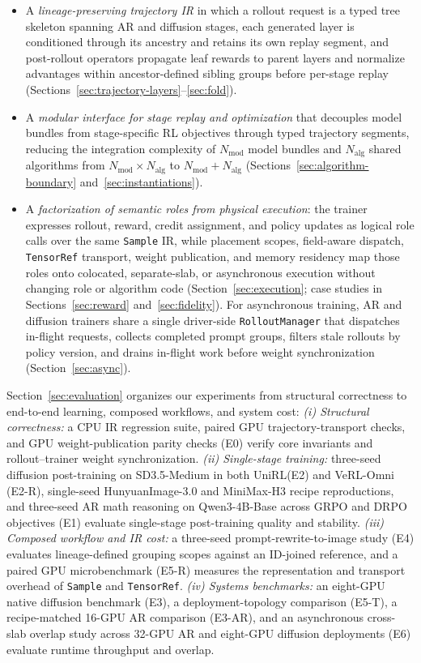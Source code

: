 \documentclass[10pt]{article}
\newcommand{\system}{UniRL\xspace}
\newcommand{\sample}{\texttt{Sample}}
\begin{document}
\begin{itemize}
  \item A \emph{lineage-preserving trajectory IR} in which a rollout request is a typed tree skeleton spanning AR and diffusion stages, each generated layer is conditioned through its ancestry and retains its own replay segment, and post-rollout operators propagate leaf rewards to parent layers and normalize advantages within ancestor-defined sibling groups before per-stage replay (Sections~\ref{sec:trajectory-layers}--\ref{sec:fold}).
  \item A \emph{modular interface for stage replay and optimization} that decouples model bundles from stage-specific RL objectives through typed trajectory segments, reducing the integration complexity of $N_{\mathrm{mod}}$ model bundles and $N_{\mathrm{alg}}$ shared algorithms from $N_{\mathrm{mod}}\times N_{\mathrm{alg}}$ to $N_{\mathrm{mod}}+N_{\mathrm{alg}}$ (Sections~\ref{sec:algorithm-boundary} and~\ref{sec:instantiations}).
  \item A \emph{factorization of semantic roles from physical execution}: the trainer expresses rollout, reward, credit assignment, and policy updates as logical role calls over the same \sample{} IR, while placement scopes, field-aware dispatch, \texttt{TensorRef} transport, weight publication, and memory residency map those roles onto colocated, separate-slab, or asynchronous execution without changing role or algorithm code (Section~\ref{sec:execution}; case studies in Sections~\ref{sec:reward} and~\ref{sec:fidelity}). For asynchronous training, AR and diffusion trainers share a single driver-side \texttt{RolloutManager} that dispatches in-flight requests, collects completed prompt groups, filters stale rollouts by policy version, and drains in-flight work before weight synchronization (Section~\ref{sec:async}).
\end{itemize}

Section~\ref{sec:evaluation} organizes our experiments from structural correctness to end-to-end learning, composed workflows, and system cost:
\emph{(i) Structural correctness:} a CPU IR regression suite, paired GPU trajectory-transport checks, and GPU weight-publication parity checks (E0) verify core invariants and rollout--trainer weight synchronization.
\emph{(ii) Single-stage training:} three-seed diffusion post-training on SD3.5-Medium in both \system (E2) and VeRL-Omni (E2-R), single-seed HunyuanImage-3.0 and MiniMax-H3 recipe reproductions, and three-seed AR math reasoning on Qwen3-4B-Base across GRPO and DRPO objectives (E1) evaluate single-stage post-training quality and stability.
\emph{(iii) Composed workflow and IR cost:} a three-seed prompt-rewrite-to-image study (E4) evaluates lineage-defined grouping scopes against an ID-joined reference, and a paired GPU microbenchmark (E5-R) measures the representation and transport overhead of \sample{} and \texttt{TensorRef}.
\emph{(iv) Systems benchmarks:} an eight-GPU native diffusion benchmark (E3), a deployment-topology comparison (E5-T), a recipe-matched 16-GPU AR comparison (E3-AR), and an asynchronous cross-slab overlap study across 32-GPU AR and eight-GPU diffusion deployments (E6) evaluate runtime throughput and overlap.
\end{document}
